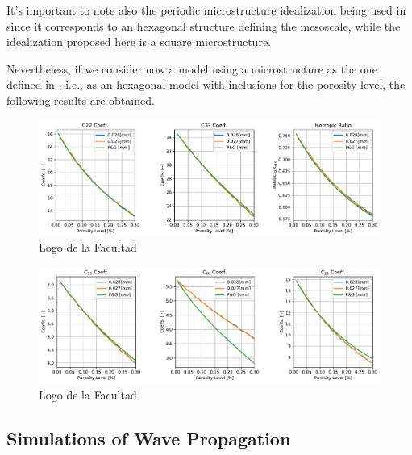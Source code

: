 \begin{rem}
It's important to note also the periodic microstructure idealization being used in \cite{Parnell2008} since it corresponds to an hexagonal structure defining the mesoscale, while the idealization proposed here is a square microstructure.
\end{rem}

Nevertheless, if we consider now a model using a microstructure as the one defined in \cite{Parnell2008}, i.e., as an hexagonal model with inclusions for the porosity level, the following results are obtained.

\begin{figure}[!h]
	\centering
	\includegraphics[scale=.5]{images/CellsProb/CellProb_MainHomCoeffsCircularHexa.pdf}
	\caption{Logo de la Facultad}
	\label{kloiuouda}
\end{figure}

\begin{figure}[!h]
	\centering
	\includegraphics[scale=.5]{images/CellsProb/CellProb_OthersHomCoeffsCircularHexa.pdf}
	\caption{Logo de la Facultad}
	\label{klojhgjha}
\end{figure}

\subsection{Simulations of Wave Propagation}

